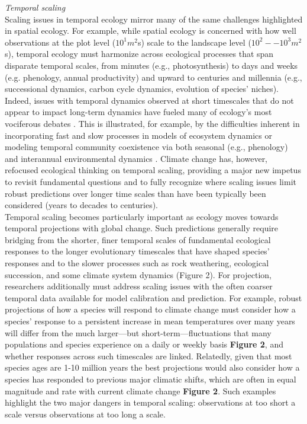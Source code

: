 \documentclass[11pt,a4paper,oneside]{article}
\begin{document}
\noindent \emph{Temporal scaling}\\
Scaling issues in temporal ecology mirror many of the same challenges highlighted in spatial ecology. For example, while spatial ecology is concerned with how well observations at the plot level ($10^{1}m^2$s) scale to the landscape level ($10^{2}--10^{3}m^2$s), temporal ecology must harmonize across ecological processes that span disparate temporal scales, from minutes (e.g., photosynthesis) to days and weeks (e.g. phenology, annual productivity) and upward to centuries and millennia (e.g., successional dynamics, carbon cycle dynamics, evolution of species' niches). Indeed, issues with temporal dynamics observed at short timescales that do not appear to impact long-term dynamics have fueled many of ecology's most vociferous debates \citep{wiens1986}. This is illustrated, for example, by the difficulties inherent in incorporating fast and slow processes in models of ecosystem dynamics \citep{Carpenter2000} or modeling temporal community coexistence via both seasonal (e.g., phenology) and interannual environmental dynamics \citep{Chesson:1997dz}. Climate change has, however, refocused ecological thinking on temporal scaling, providing a major new impetus to revisit fundamental questions and to fully recognize where scaling issues limit robust predictions over longer time scales than have been typically been considered (years to decades to centuries).\\

Temporal scaling becomes particularly important as ecology moves towards temporal projections with global change. Such predictions generally require bridging from the shorter, finer temporal scales of fundamental ecological responses to the longer evolutionary timescales that have shaped species' responses and to the slower processes such as rock weathering, ecological succession, and some climate system dynamics (Figure 2). For projection, researchers additionally must address scaling issues with the often coarser temporal data available for model calibration and prediction. For example, robust projections of how a species will respond to climate change must consider how a species' response to a persistent increase in mean temperatures over many years will differ from the much larger---but short-term---fluctuations that many populations and species experience on a daily or weekly basis {\bf Figure 2}, and whether responses across such timescales are linked. Relatedly, given that most species ages are 1-10 million years \citep{lawtonbook} the best projections would also consider how a species has responded to previous major climatic shifts, which are often in equal magnitude and rate with current climate change {\bf Figure 2}. Such examples highlight the two major dangers in temporal scaling: observations at too short a scale versus observations at too long a scale.\\
\end{document}
